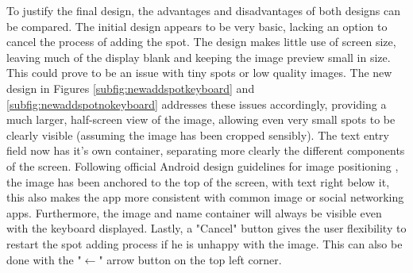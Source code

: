 To justify the final design, the advantages and disadvantages of both designs can be compared. The initial design appears to be very basic, lacking an option to cancel the process of adding the spot. The design makes little use of screen size, leaving much of the display blank and keeping the image preview small in size. This could prove to be an issue with tiny spots or low quality images. The new design in Figures \ref{subfig:newaddspotkeyboard} and \ref{subfig:newaddspotnokeyboard} addresses these issues accordingly, providing a much larger, half-screen view of the image, allowing even very small spots to be clearly visible (assuming the image has been cropped sensibly). The text entry field now has it's own container, separating more clearly the different components of the screen. Following official Android design guidelines for image positioning \cite{materialdesignimageplacement}, the image has been anchored to the top of the screen, with text right below it, this also makes the app more consistent with common image or social networking apps. Furthermore, the image and name container will always be visible even with the keyboard displayed. Lastly, a "Cancel" button gives the user flexibility to restart the spot adding process if he is unhappy with the image. This can also be done with the "$\leftarrow$" arrow button on the top left corner.
\clearpage

